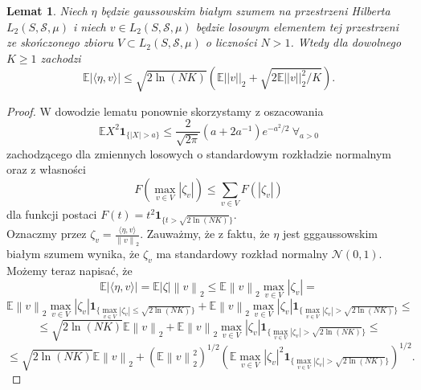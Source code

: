 \documentclass{article}
\newtheorem*{lem}{Lemat}
\newcommand{\norm}[1]{\left\lVert#1\right\rVert}
\begin{document}
\begin{lem}
Niech $\eta$ będzie gaussowskim białym szumem na przestrzeni Hilberta $L_2(S,\mathcal{S},\mu)$ i niech $v\in L_2(S,\mathcal{S},\mu)$ będzie losowym elementem tej przestrzeni ze skończonego zbioru $V\subset L_2(S,\mathcal{S},\mu)$ o liczności $N>1$. Wtedy dla dowolnego $K\geq 1$ zachodzi
\begin{displaymath}
\mathbb{E}\left|\langle \eta, v\rangle\right|\leq \sqrt{2\ln (NK)}\left(\mathbb{E}||v||_2+\sqrt{2\mathbb{E}||v||_2^2/K}\right).
\end{displaymath}
\end{lem}
\begin{proof}
W dowodzie lematu ponownie skorzystamy z oszacowania 
\begin{displaymath}
\mathbb{E}X^2\pmb{1}_{\{|X|>a\}}\leq \frac{2}{\sqrt{2\pi}}(a+2a^{-1})e^{-a^2/2}\ \forall_{a>0}
\end{displaymath}
zachodzącego dla zmiennych losowych o standardowym rozkładzie normalnym oraz z własności
\begin{displaymath}
F(\max_{v\in V}|\zeta_v|)\leq \sum_{v\in V}F(|\zeta_v|)
\end{displaymath}
dla funkcji postaci $F(t)=t^2\pmb{1}_{\{t> \sqrt{2\ln (NK)}\}}$.\\
Oznaczmy przez $\zeta_v=\frac{\langle \eta ,v\rangle}{\norm{v}_2}$. Zauważmy, że z faktu, że $\eta$ jest gggaussowskim białym szumem wynika, że $\zeta_v$ ma standardowy rozkład normalny $\mathcal{N}(0,1)$. Możemy teraz napisać, że
\begin{displaymath}
\mathbb{E}\left|\langle \eta , v\rangle\right|=\mathbb{E}|\zeta |\norm{v}_2\leq \mathbb{E}\norm{v}_2\max_{v\in V}|\zeta_v|=
\end{displaymath}
\begin{displaymath}
\mathbb{E}\norm{v}_2\max_{v\in V}|\zeta_v|\pmb{1}_{\{\max_{v\in V}|\zeta_v|\leq \sqrt{2\ln (NK)}\}}+\mathbb{E}\norm{v}_2\max_{v\in V}|\zeta_v|\pmb{1}_{\{\max_{v\in V}|\zeta_v|> \sqrt{2\ln (NK)}\}}\leq
\end{displaymath}
\begin{displaymath}
\leq \sqrt{2\ln (NK)}\mathbb{E}\norm{v}_2+\mathbb{E}\norm{v}_2\max_{v\in V}|\zeta_v|\pmb{1}_{\{\max_{v\in V}|\zeta_v|> \sqrt{2\ln (NK)}\}}\leq
\end{displaymath}
\begin{displaymath}
\leq \sqrt{2\ln (NK)}\mathbb{E}\norm{v}_2+\left(\mathbb{E}\norm{v}_2^2\right)^{1/2}\left(\mathbb{E}\max_{v\in V}|\zeta_v|^2\pmb{1}_{\{\max_{v\in V}|\zeta_v|> \sqrt{2\ln (NK)}\}}\right)^{1/2}.

\end{displaymath}
\end{proof}
\end{document}
